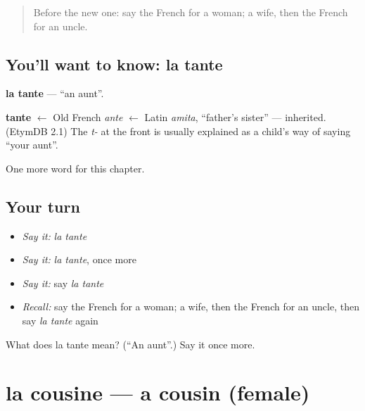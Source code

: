 \label{lesson:FR-C57-tante}



\begin{quote}
Before the new one: say the French for a woman; a wife, then the French for an uncle.
\end{quote}

\subsection*{You'll want to know: la tante}
\textbf{la tante} — \textquotedblleft{}an aunt\textquotedblright{}.

\begin{cousinweb}
\textbf{tante} $\leftarrow$ Old French \emph{ante} $\leftarrow$ Latin \emph{amita}, \textquotedblleft{}father's sister\textquotedblright{} — inherited. (EtymDB 2.1) The \emph{t-} at the front is usually explained as a child's way of saying \textquotedblleft{}your aunt\textquotedblright{}.
\end{cousinweb}

\begin{grammarlens}[title={What you've built}]
One more word for this chapter.
\end{grammarlens}

\subsection*{Your turn}
\begin{itemize}
\raggedright
  \item \emph{Say it:} \emph{la tante}
  \item \emph{Say it:} \emph{la tante}, once more
  \item \emph{Say it:} say \emph{la tante}
  \item \emph{Recall:} say the French for a woman; a wife, then the French for an uncle, then say \emph{la tante} again
\end{itemize}

\begin{tcolorbox}[breakable,colback=teal!4,colframe=teal!35!black,title={Before you move on}]
What does la tante mean? (\textquotedblleft{}An aunt\textquotedblright{}.) Say it once more.
\end{tcolorbox}
\section[la cousine]{la cousine — a cousin (female)}

